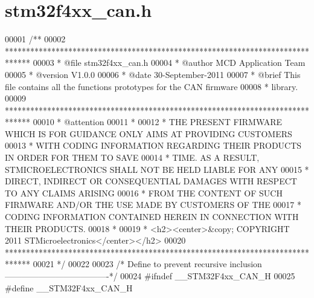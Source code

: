\section{stm32f4xx\+\_\+can.\+h}
\label{stm32f4xx__can_8h_source}

\begin{DoxyCode}
00001 \textcolor{comment}{/**}
00002 \textcolor{comment}{  ******************************************************************************}
00003 \textcolor{comment}{  * @file    stm32f4xx\_can.h}
00004 \textcolor{comment}{  * @author  MCD Application Team}
00005 \textcolor{comment}{  * @version V1.0.0}
00006 \textcolor{comment}{  * @date    30-September-2011}
00007 \textcolor{comment}{  * @brief   This file contains all the functions prototypes for the CAN firmware }
00008 \textcolor{comment}{  *          library.}
00009 \textcolor{comment}{  ******************************************************************************}
00010 \textcolor{comment}{  * @attention}
00011 \textcolor{comment}{  *}
00012 \textcolor{comment}{  * THE PRESENT FIRMWARE WHICH IS FOR GUIDANCE ONLY AIMS AT PROVIDING CUSTOMERS}
00013 \textcolor{comment}{  * WITH CODING INFORMATION REGARDING THEIR PRODUCTS IN ORDER FOR THEM TO SAVE}
00014 \textcolor{comment}{  * TIME. AS A RESULT, STMICROELECTRONICS SHALL NOT BE HELD LIABLE FOR ANY}
00015 \textcolor{comment}{  * DIRECT, INDIRECT OR CONSEQUENTIAL DAMAGES WITH RESPECT TO ANY CLAIMS ARISING}
00016 \textcolor{comment}{  * FROM THE CONTENT OF SUCH FIRMWARE AND/OR THE USE MADE BY CUSTOMERS OF THE}
00017 \textcolor{comment}{  * CODING INFORMATION CONTAINED HEREIN IN CONNECTION WITH THEIR PRODUCTS.}
00018 \textcolor{comment}{  *}
00019 \textcolor{comment}{  * <h2><center>&copy; COPYRIGHT 2011 STMicroelectronics</center></h2>}
00020 \textcolor{comment}{  ******************************************************************************}
00021 \textcolor{comment}{  */}
00022 
00023 \textcolor{comment}{/* Define to prevent recursive inclusion -------------------------------------*/}
00024 \textcolor{preprocessor}{#}\textcolor{preprocessor}{ifndef} \textcolor{preprocessor}{\_\_STM32F4xx\_CAN\_H}
00025 \textcolor{preprocessor}{#}\textcolor{preprocessor}{define} \textcolor{preprocessor}{\_\_STM32F4xx\_CAN\_H}

\end{DoxyCode}
